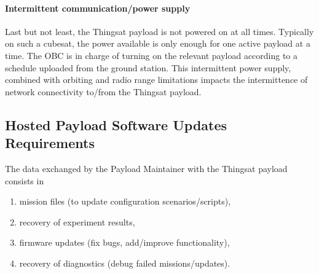 \paragraph*{Intermittent communication/power supply}
Last but not least, the Thingsat payload is not powered on at all times.
Typically on such a cubesat, the power available is only
enough for one active payload at a time. 
The OBC is in charge of turning on the relevant payload according to a schedule uploaded from the ground station. 
This intermittent power supply, combined with orbiting and radio range limitations impacts the intermittence of network connectivity to/from the Thingsat payload.

\subsection{Hosted Payload Software Updates Requirements}


The data exchanged by the Payload Maintainer with the Thingsat payload consists in 
\begin{enumerate}
    \item mission files (to update configuration scenarios/scripts),
    \item recovery of experiment results,
    \item firmware updates (fix bugs, add/improve functionality),
    \item recovery of diagnostics (debug failed missions/updates).
\end{enumerate} 


